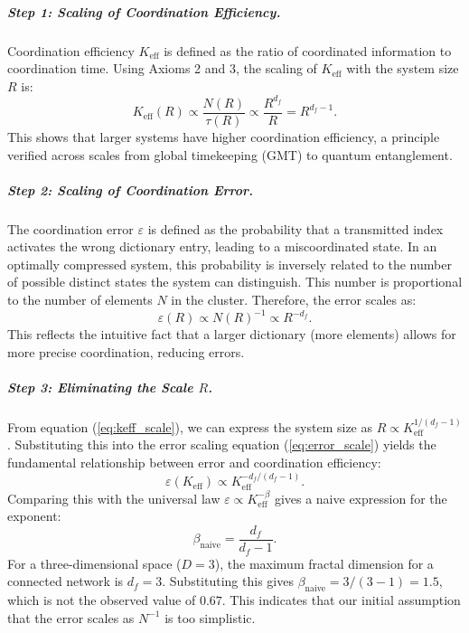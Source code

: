 \documentclass[12pt,a4paper]{article}
\theoremstyle{remark}
\newcommand{\Ke}{K_{\mathrm{eff}}}
\begin{document}
\subparagraph*{Step 1: Scaling of Coordination Efficiency.}
Coordination efficiency \(\Ke\) is defined as the ratio of coordinated information to coordination time. Using Axioms 2 and 3, the scaling of \(\Ke\) with the system size \(R\) is:
\begin{equation}
	\Ke(R) \propto \frac{N(R)}{\tau(R)} \propto \frac{R^{d_f}}{R} = R^{d_f - 1}.
	\label{eq:keff_scale}
\end{equation}
This shows that larger systems have higher coordination efficiency, a principle verified across scales from global timekeeping (GMT) to quantum entanglement.

\subparagraph*{Step 2: Scaling of Coordination Error.}
The coordination error \(\varepsilon\) is defined as the probability that a transmitted index activates the wrong dictionary entry, leading to a miscoordinated state. In an optimally compressed system, this probability is inversely related to the number of possible distinct states the system can distinguish. This number is proportional to the number of elements \(N\) in the cluster. Therefore, the error scales as:
\begin{equation}
	\varepsilon(R) \propto N(R)^{-1} \propto R^{-d_f}.
	\label{eq:error_scale}
\end{equation}
This reflects the intuitive fact that a larger dictionary (more elements) allows for more precise coordination, reducing errors.

\subparagraph*{Step 3: Eliminating the Scale \(R\).}
From equation (\ref{eq:keff_scale}), we can express the system size as \(R \propto \Ke^{1/(d_f-1)}\). Substituting this into the error scaling equation (\ref{eq:error_scale}) yields the fundamental relationship between error and coordination efficiency:
\begin{equation}
	\varepsilon(\Ke) \propto \Ke^{-d_f/(d_f-1)}.
	\label{eq:error_keff_naive}
\end{equation}
Comparing this with the universal law \(\varepsilon \propto \Ke^{-\beta}\) gives a naive expression for the exponent:
\begin{equation}
	\beta_{\text{naive}} = \frac{d_f}{d_f-1}.
	\label{eq:beta_naive}
\end{equation}
For a three-dimensional space (\(D = 3\)), the maximum fractal dimension for a connected network is \(d_f = 3\). Substituting this gives \(\beta_{\text{naive}} = 3/(3-1) = 1.5\), which is not the observed value of \(0.67\). This indicates that our initial assumption that the error scales as \(N^{-1}\) is too simplistic.
\end{document}
